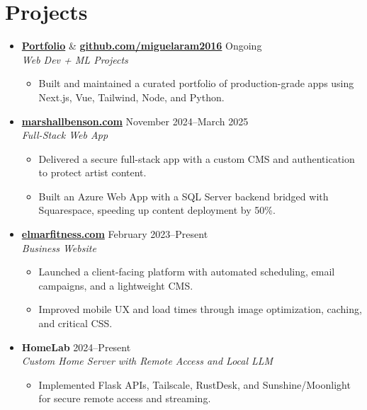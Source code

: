\documentclass[letterpaper,10pt]{article}
\newcommand{\resumeItem}[1]{\item \small{#1}}
\begin{document}
\section*{Projects}
\begin{itemize}
  \item[]
    \textbf{\href{https://mig.is-a.dev}{Portfolio}} \& \textbf{\href{https://github.com/miguelaram2016}{github.com/miguelaram2016}} \hfill Ongoing \\
    \textit{Web Dev + ML Projects}
    \begin{itemize}[leftmargin=0.15in]
      \resumeItem{Built and maintained a curated portfolio of production-grade apps using Next.js, Vue, Tailwind, Node, and Python.}
    \end{itemize}

  \item[]
    \textbf{\href{https://marshallbenson.com}{marshallbenson.com}} \hfill November 2024--March 2025 \\
    \textit{Full-Stack Web App}
    \begin{itemize}[leftmargin=0.15in]
      \resumeItem{Delivered a secure full-stack app with a custom CMS and authentication to protect artist content.}
      \resumeItem{Built an Azure Web App with a SQL Server backend bridged with Squarespace, speeding up content deployment by 50\%.}
    \end{itemize}

  \item[]
    \textbf{\href{https://elmarfitness.com}{elmarfitness.com}} \hfill February 2023--Present \\
    \textit{Business Website}
    \begin{itemize}[leftmargin=0.15in]
      \resumeItem{Launched a client-facing platform with automated scheduling, email campaigns, and a lightweight CMS.}
      \resumeItem{Improved mobile UX and load times through image optimization, caching, and critical CSS.}
    \end{itemize}

  \item[]
    \textbf{HomeLab} \hfill 2024--Present \\
    \textit{Custom Home Server with Remote Access and Local LLM}
    \begin{itemize}[leftmargin=0.15in]
      \resumeItem{Implemented Flask APIs, Tailscale, RustDesk, and Sunshine/Moonlight for secure remote access and streaming.}
    \end{itemize}
\end{itemize}
\end{document}
